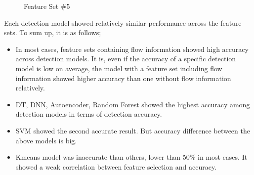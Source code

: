 \documentclass[fontsize=10pt]{article}
\begin{document}
\begin{figure}[H]
   \begin{minipage}{0.48\textwidth}
     \centering
     \caption{Feature Set \#5}\label{Fig:Data1}
   \end{minipage}\hfill
\end{figure}

Each detection model showed relatively similar performance across the feature sets. To sum up, it is as follows;
\begin{itemize}
    \item In most cases, feature sets containing flow information showed high accuracy across detection models. It is, even if the accuracy of a specific detection model is low on average, the model with a feature set including flow information showed higher accuracy than one without flow information relatively.
    \item DT, DNN, Autoencoder, Random Forest showed the highest accuracy among detection models in terms of detection accuracy.
    \item SVM showed the second accurate result. But accuracy difference between the above models is big.
    \item Kmeans model was inaccurate than others, lower than 50\% in most cases. It showed a weak correlation between feature selection and accuracy.
\end{itemize}
\end{document}

